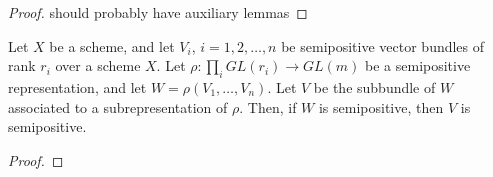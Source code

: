 \begin{proof}
should probably have auxiliary lemmas
\end{proof}

\begin{lemma}
Let $X$ be a scheme, and let $V_i$, $i=1,2,\ldots,n$ be semipositive vector bundles of rank $r_i$ over a scheme $X$. Let $\rho:\prod_i GL(r_i)\to GL(m)$ be a semipositive representation, and let $W=\rho(V_1,\ldots,V_n)$. Let $V$ be the subbundle of $W$ associated to a subrepresentation of $\rho$. Then, if $W$ is semipositive, then $V$ is semipositive.
\end{lemma}

\begin{proof}

\end{proof}







